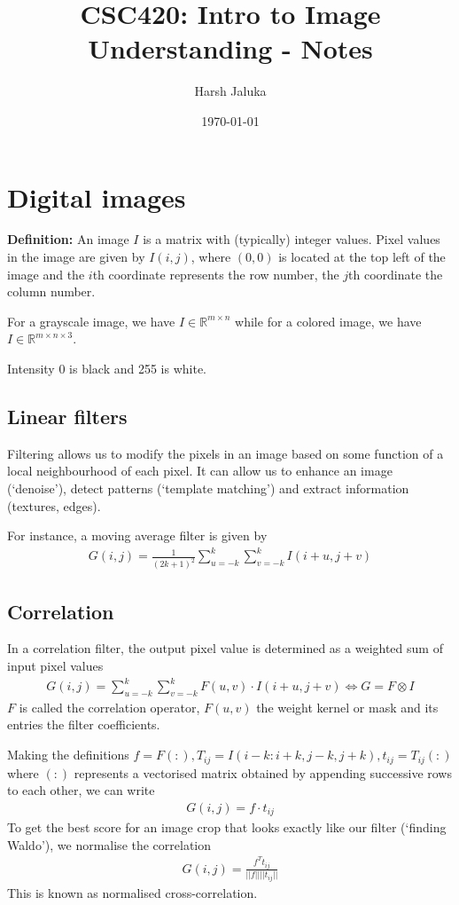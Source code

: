 \documentclass[11pt]{article}
\title{CSC420: Intro to Image Understanding - Notes}
\author{Harsh Jaluka}
\date{\today}
\newcommand{\R}{\mathbb{R}}
\begin{document}
\begin{titlepage}
\maketitle 
\end{titlepage}

\newpage 
\tableofcontents

\newpage 
\section{Digital images}
\textbf{Definition:} An image $I$ is a matrix with (typically) integer values. Pixel values in the image are given by $I(i, j)$, where $(0,0)$ is located at the top left of the image and the $i$th coordinate represents the row number, the $j$th coordinate the column number. 

For a grayscale image, we have $I \in \R^{m \times n}$ while for a colored image, we have $I \in \R^{m \times n \times 3}$. 

Intensity 0 is black and 255 is white. 

\subsection{Linear filters}
Filtering allows us to modify the pixels in an image based on some function of a local neighbourhood of each pixel. It can allow us to enhance an image (`denoise'), detect patterns (`template matching') and extract information (textures, edges). 

For instance, a moving average filter is given by 
\begin{align*}
    G(i, j) = \frac{1}{(2k+1)^2} \sum_{u = -k}^k \sum_{v = -k}^k I(i + u, j + v) 
\end{align*}

\subsection{Correlation}
In a correlation filter, the output pixel value is determined as a weighted sum of input pixel values 
\begin{align*}
    G(i,j) = \sum_{u = -k}^k \sum_{v = -k}^k F(u,v) \cdot I(i + u, j + v) \iff G = F \otimes I 
\end{align*}
$F$ is called the correlation operator, $F(u,v)$ the weight kernel or mask and its entries the filter coefficients. 

Making the definitions $f = F(:), T_{ij} = I(i-k:i+k, j-k, j+k), t_{ij} = T_{ij}(:)$ where $(:)$ represents a vectorised matrix obtained by appending successive rows to each other, we can write
\begin{align*}
    G(i,j) = f \cdot t_{ij}
\end{align*}
To get the best score for an image crop that looks exactly like our filter (`finding Waldo'), we normalise the correlation 
\begin{align*}
    G(i,j) = \frac{f^T t_{ij}}{||f|| ||t_{ij}||}
\end{align*}
This is known as normalised cross-correlation. 
\end{document}
